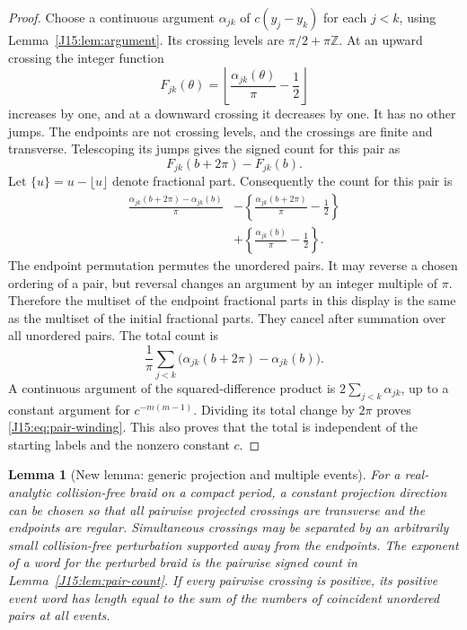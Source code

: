 \documentclass[11pt,oneside]{report}
\newtheorem{lemma}[theorem]{Lemma}
\theoremstyle{definition}
\numberwithin{equation}{section}
\newcommand{\Z}{\mathbb Z}
\begin{document}
\begin{proof}
Choose a continuous argument $\alpha_{jk}$ of $c(y_j-y_k)$ for each
$j<k$, using Lemma~\ref{J15:lem:argument}. Its crossing levels are
$\pi/2+\pi\Z$. At an upward crossing the integer function
\[
 F_{jk}(\theta)=
   \left\lfloor\frac{\alpha_{jk}(\theta)}\pi-\frac12\right\rfloor
\]
increases by one, and at a downward crossing it decreases by one.
It has no other jumps. The endpoints are not crossing levels, and the
crossings are finite and transverse. Telescoping its jumps gives the signed
count for this pair as
\[
 F_{jk}(b+2\pi)-F_{jk}(b).
\]
Let $\{u\}=u-\lfloor u\rfloor$ denote fractional part.
Consequently the count for this pair is
\begin{align*}
 \frac{\alpha_{jk}(b+2\pi)-\alpha_{jk}(b)}\pi
 &-\left\{\frac{\alpha_{jk}(b+2\pi)}\pi-\frac12\right\}\\
 &+\left\{\frac{\alpha_{jk}(b)}\pi-\frac12\right\}.
\end{align*}
The endpoint permutation permutes the unordered pairs. It may reverse a
chosen ordering of a pair, but reversal changes an argument by an integer
multiple of $\pi$. Therefore the multiset of the endpoint fractional parts
in this display is the same as the multiset of the initial fractional parts.
They cancel after summation over all unordered pairs. The total count is
\[
 \frac1\pi\sum_{j<k}
       \bigl(\alpha_{jk}(b+2\pi)-\alpha_{jk}(b)\bigr).
\]
A continuous argument of the squared-difference product is
$2\sum_{j<k}\alpha_{jk}$, up to a constant argument for
$c^{-m(m-1)}$. Dividing its total change by $2\pi$ proves
\eqref{J15:eq:pair-winding}. This also proves that the total is independent
of the starting labels and the nonzero constant $c$.
\end{proof}

\begin{lemma}[New lemma: generic projection and multiple events]
\label{J15:lem:events}
For a real-analytic collision-free braid on a compact period, a constant
projection direction can be chosen so that all pairwise projected crossings
are transverse and the endpoints are regular. Simultaneous crossings may
be separated by an arbitrarily small collision-free perturbation supported
away from the endpoints. The exponent of a word for the perturbed braid
is the pairwise signed count in Lemma~\ref{J15:lem:pair-count}.
If every pairwise crossing is positive, its positive event word has length
equal to the sum of the numbers of coincident unordered pairs at all events.
\end{lemma}
\end{document}
